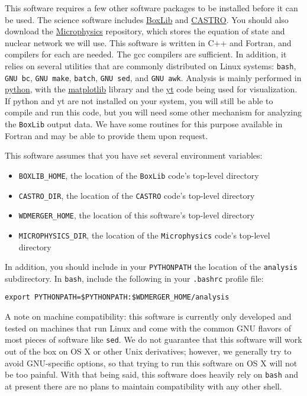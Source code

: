 \documentclass[12pt]{book}
\begin{document}
This software requires a few other software packages to be installed before it can be used.
The science software includes \href{http://boxlib-codes.github.io/}{BoxLib} and 
\href{http://boxlib-codes.github.io/Castro/}{CASTRO}. You should also 
download the \href{https://github.com/BoxLib-Codes/Microphysics}{Microphysics} repository, 
which stores the equation of state and nuclear network we will use. This software is written 
in C++ and Fortran, and compilers for each are needed. The gcc compilers are sufficient.
In addition, it relies on several utilities that are 
commonly distributed on Linux systems: \texttt{bash}, \texttt{GNU bc}, \texttt{GNU make}, 
\texttt{batch}, \texttt{GNU sed}, and \texttt{GNU awk}. Analysis is mainly performed in 
\href{https://www.python.org/}{python}, with the \href{http://matplotlib.org/}{matplotlib} 
library and the \href{http://yt-project.org/}{yt} code being used for visualization. 
If python and yt are not installed on your system, you will still be able to compile and 
run this code, but you will need some other mechanism for analyzing the \texttt{BoxLib} output data.
We have some routines for this purpose available in Fortran and may be able to provide them
upon request.

This software assumes that you have set several environment variables:
\begin{itemize}
  \item \texttt{BOXLIB\_HOME}, the location of the \texttt{BoxLib} code's top-level directory
  \item \texttt{CASTRO\_DIR}, the location of the \texttt{CASTRO} code's top-level directory
  \item \texttt{WDMERGER\_HOME}, the location of this software's top-level directory
  \item \texttt{MICROPHYSICS\_DIR}, the location of the \texttt{Microphysics} code's top-level directory
\end{itemize}

In addition, you should include in your \texttt{PYTHONPATH} the location of the 
\texttt{analysis} subdirectory. In \texttt{bash}, include the following in your 
\texttt{.bashrc} profile file:

\texttt{export PYTHONPATH=\$PYTHONPATH:\$WDMERGER\_HOME/analysis}

A note on machine compatibility: this software is currently only developed and tested on
machines that run Linux and come with the common GNU flavors of most pieces of software
like \texttt{sed}. We do not guarantee that this software will work out of the box on OS X
or other Unix derivatives; however, we generally try to avoid GNU-specific options, so that 
trying to run this software on OS X will not be too painful. With that being said, this 
software does heavily rely on \texttt{bash} and at present there are no plans to maintain
compatibility with any other shell.
\end{document}
